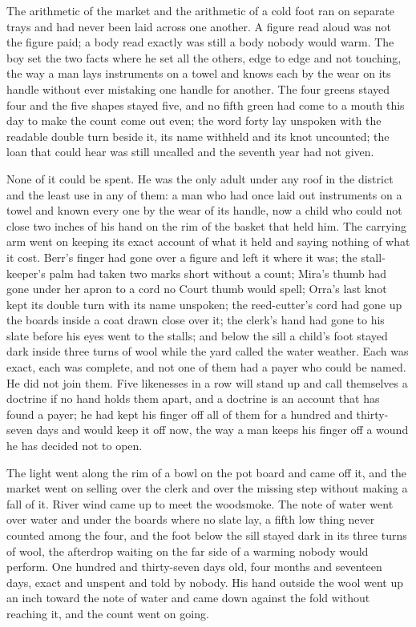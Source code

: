 \scenebreak

The arithmetic of the market and the arithmetic of a cold foot ran on separate trays and had never been laid across one another. A figure read aloud was not the figure paid; a body read exactly was still a body nobody would warm. The boy set the two facts where he set all the others, edge to edge and not touching, the way a man lays instruments on a towel and knows each by the wear on its handle without ever mistaking one handle for another. The four greens stayed four and the five shapes stayed five, and no fifth green had come to a mouth this day to make the count come out even; the word forty lay unspoken with the readable double turn beside it, its name withheld and its knot uncounted; the loan that could hear was still uncalled and the seventh year had not given.

None of it could be spent. He was the only adult under any roof in the district and the least use in any of them: a man who had once laid out instruments on a towel and known every one by the wear of its handle, now a child who could not close two inches of his hand on the rim of the basket that held him. The carrying arm went on keeping its exact account of what it held and saying nothing of what it cost. Berr's finger had gone over a figure and left it where it was; the stall-keeper's palm had taken two marks short without a count; Mira's thumb had gone under her apron to a cord no Court thumb would spell; Orra's last knot kept its double turn with its name unspoken; the reed-cutter's cord had gone up the boards inside a coat drawn close over it; the clerk's hand had gone to his slate before his eyes went to the stalls; and below the sill a child's foot stayed dark inside three turns of wool while the yard called the water weather. Each was exact, each was complete, and not one of them had a payer who could be named. He did not join them. Five likenesses in a row will stand up and call themselves a doctrine if no hand holds them apart, and a doctrine is an account that has found a payer; he had kept his finger off all of them for a hundred and thirty-seven days and would keep it off now, the way a man keeps his finger off a wound he has decided not to open.

The light went along the rim of a bowl on the pot board and came off it, and the market went on selling over the clerk and over the missing step without making a fall of it. River wind came up to meet the woodsmoke. The note of water went over water and under the boards where no slate lay, a fifth low thing never counted among the four, and the foot below the sill stayed dark in its three turns of wool, the afterdrop waiting on the far side of a warming nobody would perform. One hundred and thirty-seven days old, four months and seventeen days, exact and unspent and told by nobody. His hand outside the wool went up an inch toward the note of water and came down against the fold without reaching it, and the count went on going.
